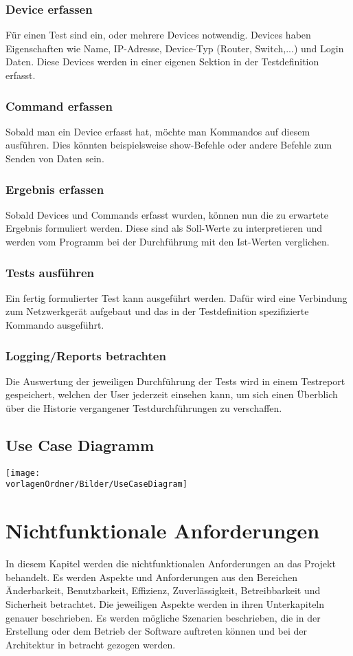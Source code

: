 \documentclass[
	ngerman,
	toc=listof, %
	toc=bibliography, %
	footnotes=multiple, %
	parskip=half, %
	numbers=noendperiod %
]{scrartcl}
\newcommand{\vorlagenOrdner}{../../99_Vorlagen} %
\begin{document}
		\subsubsection{Device erfassen}
			Für einen Test sind ein, oder mehrere Devices notwendig. Devices haben Eigenschaften wie Name, IP-Adresse, Device-Typ (Router, Switch,...) und Login Daten.
			Diese Devices werden in einer eigenen Sektion in der Testdefinition erfasst.

		\subsubsection{Command erfassen}
			Sobald man ein Device erfasst hat, möchte man Kommandos auf diesem ausführen.
			Dies könnten beispielsweise show-Befehle oder andere Befehle zum Senden von Daten sein. 

		\subsubsection{Ergebnis erfassen}
			Sobald Devices und Commands erfasst wurden, können nun die zu erwartete Ergebnis formuliert werden. Diese sind als Soll-Werte zu interpretieren und werden vom Programm bei der Durchführung mit den Ist-Werten verglichen.

		\subsubsection{Tests ausführen}
			Ein fertig formulierter Test kann ausgeführt werden.
			Dafür wird eine Verbindung zum Netzwerkgerät aufgebaut und das in der Testdefinition spezifizierte Kommando ausgeführt.

		\subsubsection{Logging/Reports betrachten}
			Die Auswertung der jeweiligen Durchführung der Tests wird in einem Testreport gespeichert, welchen der User jederzeit einsehen kann, um sich einen Überblich über die Historie vergangener Testdurchführungen zu verschaffen.

	\subsection{Use Case Diagramm}
		\texttt{[image: \\vorlagenOrdner/Bilder/UseCaseDiagram]}

\section{Nichtfunktionale Anforderungen}
	In diesem Kapitel werden die nichtfunktionalen Anforderungen an das Projekt behandelt.
	Es werden Aspekte und Anforderungen aus den Bereichen Änderbarkeit, Benutzbarkeit, Effizienz, Zuverlässigkeit, Betreibbarkeit und Sicherheit betrachtet.
	Die jeweiligen Aspekte werden in ihren Unterkapiteln genauer beschrieben.
	Es werden mögliche Szenarien beschrieben, die in der Erstellung oder dem Betrieb der Software auftreten können und bei der Architektur in betracht gezogen werden.
\end{document}
